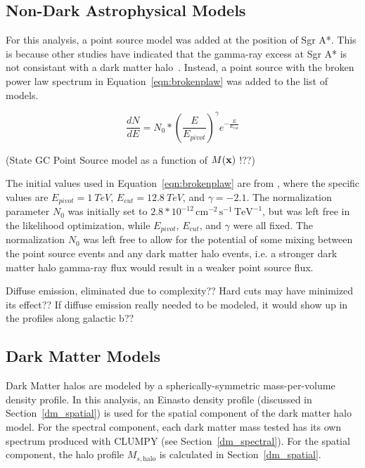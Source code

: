   \FloatBarrier

  \subsection{Non-Dark Astrophysical Models}\label{subsec:gcpointsrc}
  For this analysis, a point source model was added at the position of Sgr A*.
  This is because other studies have indicated that the gamma-ray excess at Sgr A* is not consistant with a dark matter halo~\cite{gc_pnt_is_not_dm1, gc_pnt_is_not_dm2, gc_pnt_is_not_dm3}.
  Instead, a point source with the broken power law spectrum in Equation~\ref{eqn:brokenplaw} was added to the list of models.
  
  \begin{equation}\label{eqn:brokenplaw}
    \frac{dN}{dE} = N_{0} * { \left ( \frac{E}{E_{pivot}} \right ) }^{\gamma} {e}^{-\frac{E}{E_{cut}}}
  \end{equation}

  {\color{red}(State GC Point Source model as a function of $M(\mathbf{x })$ !??)}
  
  The initial values used in Equation~\ref{eqn:brokenplaw} are from \cite{VeritasGCRidge2015}, where the specific values are $E_{pivot}=\SI{1}{TeV}$, $E_{cut}=\SI{12.8}{TeV}$, and $\gamma=-2.1$.
  The normalization parameter $N_{0}$ was initially set to $2.8*{10}^{-12}\,\text{cm}^{-2}\,\text{s}^{-1}\,\text{TeV}^{-1}$, but was left free in the likelihood optimization, while $E_{pivot}$, $E_{cut}$, and $\gamma$ were all fixed.
  The normalization $N_{0}$ was left free to allow for the potential of some mixing between the point source events and any dark matter halo events, i.e. a stronger dark matter halo gamma-ray flux would result in a weaker point source flux.
  
  Diffuse emission, eliminated due to complexity??
  Hard cuts may have minimized its effect??
  If diffuse emission really needed to be modeled, it would show up in the profiles along galactic b??

  \subsection{Dark Matter Models}\label{subsec:dmhalomodel}
  Dark Matter halos are modeled by a spherically-symmetric mass-per-volume density profile.
  In this analysis, an Einasto density profile (discussed in Section~\ref{dm_spatial}) is used for the spatial component of the dark matter halo model.
  For the spectral component, each dark matter mass tested has its own spectrum produced with CLUMPY (see Section~\ref{dm_spectral}).
  For the spatial component, the halo profile $M_{s,\textrm{halo}}$ is calculated in Section~\ref{dm_spatial}.

